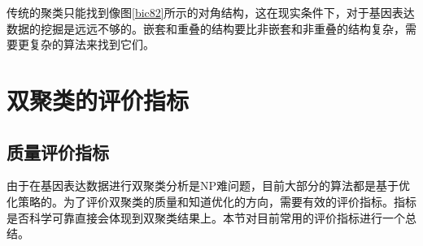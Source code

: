   传统的聚类只能找到像图\ref{bic82}所示的对角结构，这在现实条件下，对于基因表达数据的挖掘是远远不够的。嵌套和重叠的结构要比非嵌套和非重叠的结构复杂，需要更复杂的算法来找到它们。

  
\section{双聚类的评价指标}
  \subsection{质量评价指标}\label{section:qualityEval}
  由于在基因表达数据进行双聚类分析是NP难问题，目前大部分的算法都是基于优化策略的。为了评价双聚类的质量和知道优化的方向，需要有效的评价指标。指标是否科学可靠直接会体现到双聚类结果上。本节对目前常用的评价指标进行一个总结。
  

